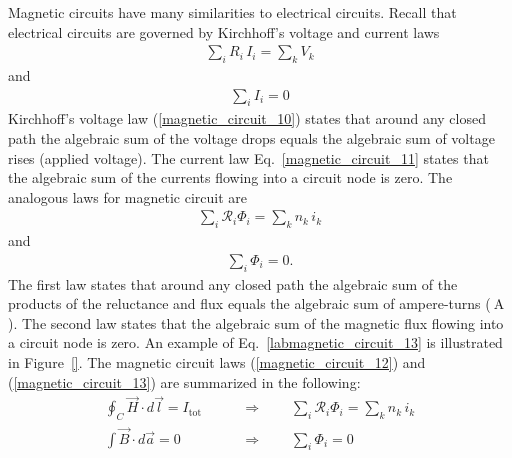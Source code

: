 \documentclass[12pt,a4paper,oneside]{book}
\begin{document}
\begin{onehalfspace}
Magnetic circuits have many similarities to electrical circuits. Recall that electrical circuits are governed by Kirchhoff's voltage and current laws
\begin{equation}\label{magnetic_circuit_10}
	{\begin{aligned}
			\sum_{i}R_i\,I_i=\sum_{k}V_k
	\end{aligned}}
\end{equation} 
and
\begin{equation}\label{magnetic_circuit_11}
	{\begin{aligned}
			\sum_{i}I_i=0
	\end{aligned}}
\end{equation} 
Kirchhoff's voltage law (\ref{magnetic_circuit_10}) states that around any closed path the algebraic sum of the voltage drops equals the algebraic sum of voltage rises (applied voltage). The current law Eq.~\eqref{magnetic_circuit_11} states that the algebraic sum of the currents flowing into a circuit node is zero. The analogous laws for magnetic circuit are
\begin{equation}\label{magnetic_circuit_12}
	{\begin{aligned}
			\sum_{i}\mathscr{R}_i\Phi_i=\sum_{k}n_k\,i_k
	\end{aligned}}
\end{equation} 
and 
\begin{equation}\label{magnetic_circuit_13}
	{\begin{aligned}
			\sum_{i}\Phi_i=0.
	\end{aligned}}
\end{equation} 
The first law states that around any closed path the algebraic sum of the products of the reluctance and flux equals the algebraic sum of ampere-turns ($\SI{}{\ampere}$). The second law states that the algebraic sum of the magnetic flux flowing into a circuit node is zero. An example of Eq.~\eqref{labmagnetic_circuit_13} is illustrated in Figure~\ref{}. The magnetic circuit laws (\ref{magnetic_circuit_12}) and (\ref{magnetic_circuit_13}) are summarized in the following:
\begin{equation}\label{magnetic_circuit_14}
	\boxed{\begin{aligned}
	\oint_{C}\vec{H}\cdot d\vec{l}=I_\text{tot} \qquad&\Rightarrow\qquad\sum_{i}\mathscr{R}_i\Phi_i=\sum_{k}n_k\,i_k \\[6pt]
	\int\vec{B}\cdot d\vec{a} =0 \qquad&\Rightarrow\qquad\sum_{i}\Phi_i=0
	\end{aligned}}
\end{equation} 

\end{onehalfspace}
\end{document}

